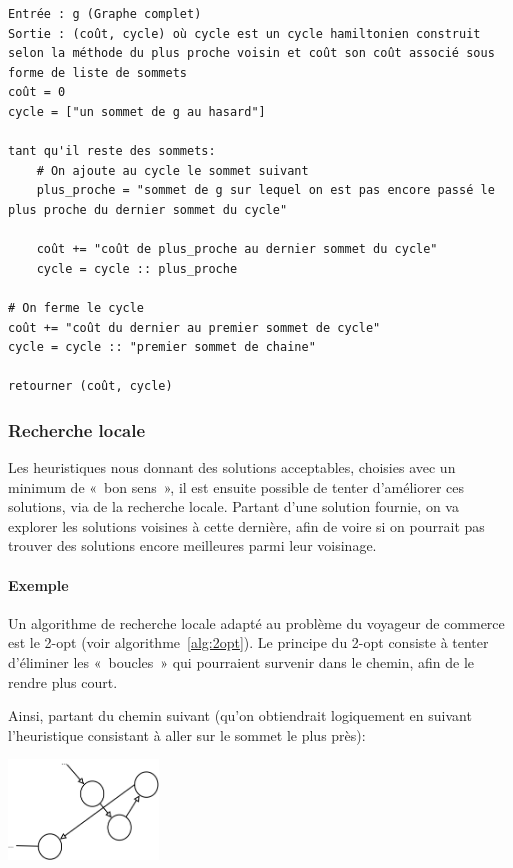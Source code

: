     \begin{lstlisting}
Entrée : g (Graphe complet)
Sortie : (coût, cycle) où cycle est un cycle hamiltonien construit selon la méthode du plus proche voisin et coût son coût associé sous forme de liste de sommets
coût = 0
cycle = ["un sommet de g au hasard"]

tant qu'il reste des sommets:
    # On ajoute au cycle le sommet suivant
    plus_proche = "sommet de g sur lequel on est pas encore passé le plus proche du dernier sommet du cycle"

    coût += "coût de plus_proche au dernier sommet du cycle"
    cycle = cycle :: plus_proche

# On ferme le cycle
coût += "coût du dernier au premier sommet de cycle"
cycle = cycle :: "premier sommet de chaine"

retourner (coût, cycle)
    \end{lstlisting}

  \subsubsection{Recherche locale}
    Les heuristiques nous donnant des solutions acceptables, choisies avec un
    minimum de «~bon sens~», il est ensuite possible de tenter d'améliorer
    ces solutions, via de la recherche locale.
    Partant d'une solution fournie, on va explorer les solutions voisines
    à cette dernière, afin de voire si on pourrait pas trouver des solutions
    encore meilleures parmi leur voisinage.

    \paragraph{Exemple} Un algorithme de recherche locale adapté au problème
    du voyageur de commerce est le 2-opt (voir algorithme~\ref{alg:2opt}).
    Le principe du 2-opt consiste à tenter d'éliminer les «~boucles~» qui
    pourraient survenir dans le chemin, afin de le rendre plus court.

    Ainsi, partant du chemin suivant (qu'on obtiendrait logiquement en suivant
    l'heuristique consistant à aller sur le sommet le plus près):

    \begin{center}
    \includegraphics[width=0.3\textwidth]{graphes/2opt1.png}
    \end{center}

